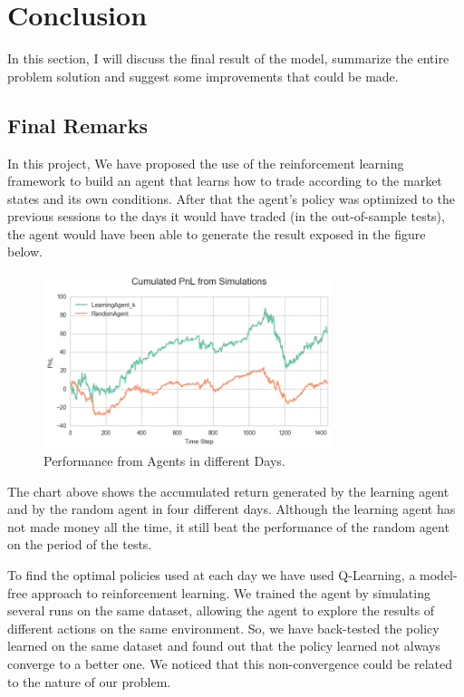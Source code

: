 \documentclass[a4paper]{article}
\begin{document}

\section{Conclusion}
\label{sec:conclusion}

In this section, I will discuss the final result of the model, summarize the entire problem solution and suggest some improvements that could be made.

\subsection{Final Remarks}

In this project, We have proposed the use of the reinforcement learning framework to build an agent that learns how to trade according to the market states and its own conditions. After that the agent's policy was optimized to the previous sessions to the days it would have traded (in the out-of-sample tests), the agent would have been able to generate the result exposed in the figure below.

\begin{figure}[ht]
\centering
\includegraphics[width=0.75\textwidth]{figures/optm_rand_several_days.png}
\caption{\label{fig:optm_rand_several_days}Performance from Agents in different Days.}
\end{figure}

The chart above shows the accumulated return generated by the learning agent and by the random agent in four different days. Although the learning agent has not made money all the time, it still beat the performance of the random agent on the period of the tests.

To find the optimal policies used at each day we have used Q-Learning, a model-free approach to reinforcement learning. We trained the agent by simulating several runs on the same dataset, allowing the agent to explore the results of different actions on the same environment. So, we have back-tested the policy learned on the same dataset and found out that the policy learned not always converge to a better one. We noticed that this non-convergence could be related to the nature of our problem.
\end{document}

